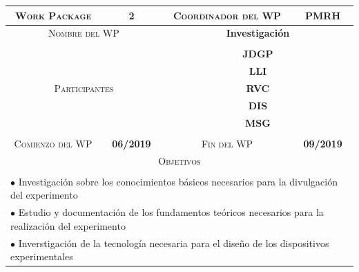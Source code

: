 \documentclass[11pt]{extarticle}
\begin{document}
				\begin{table}[H]
					\centering
					\begin{tabular}{|c|c|c|c|}
						\hline
						\textsc{Work Package} & 2 & \textsc{Coordinador del WP} & \textbf{PMRH} \\ \hline
						
						\multicolumn{2}{|c|}{\textsc{Nombre del WP}} & \multicolumn{2}{c|}{\textbf{Investigación}} \\ \hline
						\multicolumn{2}{|c|}{\multirow{7}{*}{\textsc{Participantes}}} & \multicolumn{2}{c|}{\textbf{}} \\ 
						\multicolumn{2}{|c|}{}& \multicolumn{2}{c|}{\textbf{JDGP}}\\
						\multicolumn{2}{|c|}{}& \multicolumn{2}{c|}{\textbf{LLI}}\\
						\multicolumn{2}{|c|}{}& \multicolumn{2}{c|}{\textbf{RVC}}\\
						\multicolumn{2}{|c|}{}& \multicolumn{2}{c|}{\textbf{DIS}}\\
						\multicolumn{2}{|c|}{}& \multicolumn{2}{c|}{\textbf{MSG}}\\
						\multicolumn{2}{|c|}{}& \multicolumn{2}{c|}{\textbf{}}\\ \hline
						\textsc{Comienzo del WP} & \textbf{06/2019} & \textsc{Fin del WP} & \textbf{09/2019} \\ \hline
						\multicolumn{4}{|c|}{\textsc{Objetivos}} \\
						\multicolumn{4}{|c|}{\vspace{-0.7cm}} \\
						\multicolumn{4}{|l|}{\multirow{3}{\linewidth}{$\bullet$  Investigación sobre los conocimientos básicos necesarios para la divulgación del experimento}} \\
						\multicolumn{4}{|l|}{}\\
						\multicolumn{4}{|l|}{}\\
						\multicolumn{4}{|l|}{\multirow{3}{\linewidth}{$\bullet$  Estudio y documentación de los fundamentos teóricos necesarios para la realización del experimento}} \\
						\multicolumn{4}{|l|}{}\\
						\multicolumn{4}{|l|}{}\\
						\multicolumn{4}{|l|}{\multirow{3}{\linewidth}{$\bullet$ Inverstigación de la tecnología necesaria para el diseño de los dispositivos experimentales}} \\
						\multicolumn{4}{|l|}{}\\

\end{tabular}
\end{table}
\end{document}
